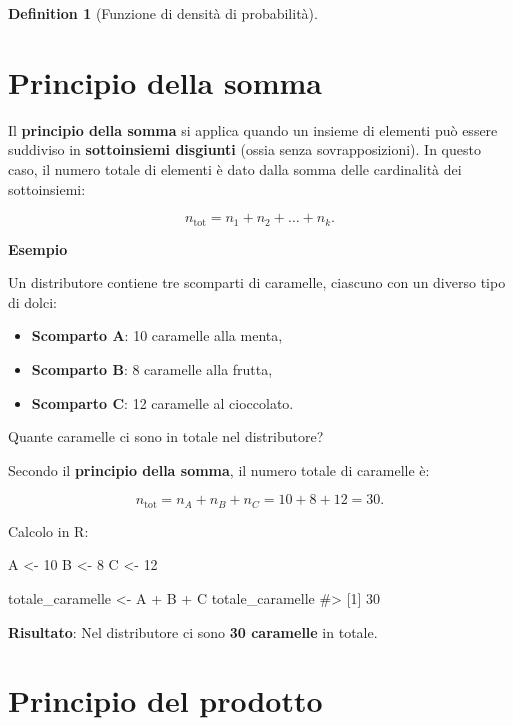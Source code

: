 \documentclass[
  letterpaper,
  DIV=11,
  numbers=noendperiod,
  oneside]{scrreprt}
\newenvironment{Shaded}{\begin{snugshade}}{\end{snugshade}}
\newcommand{\CommentTok}[1]{\textcolor[rgb]{0.37,0.37,0.37}{#1}}
\newcommand{\DecValTok}[1]{\textcolor[rgb]{0.68,0.00,0.00}{#1}}
\newcommand{\NormalTok}[1]{\textcolor[rgb]{0.00,0.23,0.31}{#1}}
\newcommand{\OtherTok}[1]{\textcolor[rgb]{0.00,0.23,0.31}{#1}}
\newcommand{\SpecialCharTok}[1]{\textcolor[rgb]{0.37,0.37,0.37}{#1}}
\providecommand{\tightlist}{%
  \setlength{\itemsep}{0pt}\setlength{\parskip}{0pt}}
\theoremstyle{definition}
\theoremstyle{plain}
\theoremstyle{definition}
\newtheorem{definition}{Definition}[chapter]
\theoremstyle{remark}
\begin{document}
\begin{definition}[Funzione di densità di
probabilità]
\section{Principio della somma}\label{principio-della-somma-1}

Il \textbf{principio della somma} si applica quando un insieme di
elementi può essere suddiviso in \textbf{sottoinsiemi disgiunti} (ossia
senza sovrapposizioni). In questo caso, il numero totale di elementi è
dato dalla somma delle cardinalità dei sottoinsiemi:

\[
n_{\text{tot}} = n_1 + n_2 + \dots + n_k .
\]

\textbf{Esempio}

Un distributore contiene tre scomparti di caramelle, ciascuno con un
diverso tipo di dolci:

\begin{itemize}
\tightlist
\item
  \textbf{Scomparto A}: 10 caramelle alla menta,\\
\item
  \textbf{Scomparto B}: 8 caramelle alla frutta,\\
\item
  \textbf{Scomparto C}: 12 caramelle al cioccolato.
\end{itemize}

Quante caramelle ci sono in totale nel distributore?

Secondo il \textbf{principio della somma}, il numero totale di caramelle
è:

\[
n_{\text{tot}} = n_A + n_B + n_C = 10 + 8 + 12 = 30.
\]

Calcolo in R:

\begin{Shaded}
\begin{Highlighting}[]
\NormalTok{A }\OtherTok{\textless{}{-}} \DecValTok{10}
\NormalTok{B }\OtherTok{\textless{}{-}} \DecValTok{8}
\NormalTok{C }\OtherTok{\textless{}{-}} \DecValTok{12}

\NormalTok{totale\_caramelle }\OtherTok{\textless{}{-}}\NormalTok{ A }\SpecialCharTok{+}\NormalTok{ B }\SpecialCharTok{+}\NormalTok{ C}
\NormalTok{totale\_caramelle}
\CommentTok{\#\textgreater{} [1] 30}
\end{Highlighting}
\end{Shaded}

\textbf{Risultato}: Nel distributore ci sono \textbf{30 caramelle} in
totale.

\section{Principio del prodotto}\label{principio-del-prodotto-1}


\end{definition}
\end{document}
